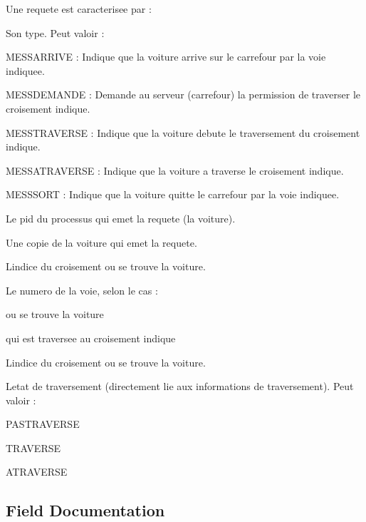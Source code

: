 Une requete est caracterisee par \+:
\begin{DoxyItemize}
\item Son type. Peut valoir \+:
\begin{DoxyItemize}
\item M\+E\+S\+S\+A\+R\+R\+I\+V\+E \+: Indique que la voiture arrive sur le carrefour par la voie indiquee.
\item M\+E\+S\+S\+D\+E\+M\+A\+N\+D\+E \+: Demande au serveur (carrefour) la permission de traverser le croisement indique.
\item M\+E\+S\+S\+T\+R\+A\+V\+E\+R\+S\+E \+: Indique que la voiture debute le traversement du croisement indique.
\item M\+E\+S\+S\+A\+T\+R\+A\+V\+E\+R\+S\+E \+: Indique que la voiture a traverse le croisement indique.
\item M\+E\+S\+S\+S\+O\+R\+T \+: Indique que la voiture quitte le carrefour par la voie indiquee.
\end{DoxyItemize}
\item Le pid du processus qui emet la requete (la voiture).
\item Une copie de la voiture qui emet la requete.
\item L\textquotesingle{}indice du croisement ou se trouve la voiture.
\item Le numero de la voie, selon le cas \+:
\begin{DoxyItemize}
\item ou se trouve la voiture
\item qui est traversee au croisement indique
\end{DoxyItemize}
\item L\textquotesingle{}indice du croisement ou se trouve la voiture.
\item L\textquotesingle{}etat de traversement (directement lie aux informations de traversement). Peut valoir \+:
\begin{DoxyItemize}
\item P\+A\+S\+T\+R\+A\+V\+E\+R\+S\+E
\item T\+R\+A\+V\+E\+R\+S\+E
\item A\+T\+R\+A\+V\+E\+R\+S\+E 
\end{DoxyItemize}
\end{DoxyItemize}

\subsection{Field Documentation}
\hypertarget{struct_requete_a558796b11448541e07f81ec0df5bf2bc}{}
